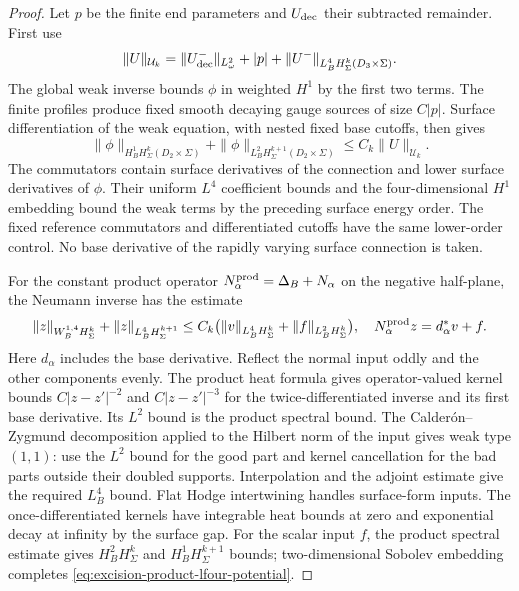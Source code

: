 \documentclass[11pt]{amsart}
\theoremstyle{definition}
\theoremstyle{remark}
\theoremstyle{plain}
\begin{document}
\begin{proof}
Let $p$ be the finite end parameters and $U_{\rm dec}$ their
subtracted remainder. First use
\[
 \|U\|_{\mathcal U_k}
  =\|U_{\rm dec}^-\|_{L^2_\omega}+|p|
                      +\|U^-\|_{L^4_BH^k_\Sigma(D_3\times\Sigma)}.
\]
The global weak inverse bounds $\phi$ in weighted $H^1$ by
the first two terms. The finite profiles produce fixed smooth
decaying gauge sources of size $C|p|$.
Surface differentiation of the weak equation, with nested
fixed base cutoffs, then gives
\[
 \|\phi\|_{H^1_BH^k_\Sigma(D_2\times\Sigma)}
     +\|\phi\|_{L^2_BH^{k+1}_\Sigma(D_2\times\Sigma)}
                                          \leq C_k\|U\|_{\mathcal U_k}.
\]
The commutators contain surface derivatives of the connection
and lower surface derivatives of $\phi$. Their uniform $L^4$
coefficient bounds and the four-dimensional $H^1$ embedding
bound the weak terms by the preceding surface energy order.
The fixed reference commutators and differentiated cutoffs
have the same lower-order control. No base derivative of
the rapidly varying surface connection is taken.

For the constant product operator
$N^{\rm prod}_\alpha=\Delta_B+N_\alpha$ on the negative
half-plane, the Neumann inverse has the estimate
\begin{equation}\label{eq:excision-product-lfour-potential}
 \|z\|_{W^{1,4}_BH^k_\Sigma}
       +\|z\|_{L^4_BH^{k+1}_\Sigma}
 \leq C_k\bigl(\|v\|_{L^4_BH^k_\Sigma}
                         +\|f\|_{L^2_BH^k_\Sigma}\bigr),
 \quad N^{\rm prod}_\alpha z=d_\alpha^*v+f.
\end{equation}
Here $d_\alpha$ includes the base derivative.
Reflect the normal input oddly and the other components evenly.
The product heat formula gives operator-valued kernel bounds
$C|z-z'|^{-2}$ and $C|z-z'|^{-3}$ for the twice-differentiated
inverse and its first base derivative. Its $L^2$ bound is the
product spectral bound. The Calder\'on--Zygmund decomposition
applied to the Hilbert norm of the input gives weak type $(1,1)$:
use the $L^2$ bound for the good part and kernel cancellation
for the bad parts outside their doubled supports.
Interpolation and the adjoint estimate give the required
$L^4_B$ bound. Flat Hodge intertwining handles surface-form
inputs. The once-differentiated kernels have integrable heat
bounds at zero and exponential decay at infinity by the surface gap.
For the scalar input $f$, the product spectral estimate gives
$H^2_BH^k_\Sigma$ and $H^1_BH^{k+1}_\Sigma$ bounds;
two-dimensional Sobolev embedding completes
\eqref{eq:excision-product-lfour-potential}.


\end{proof}
\end{document}
